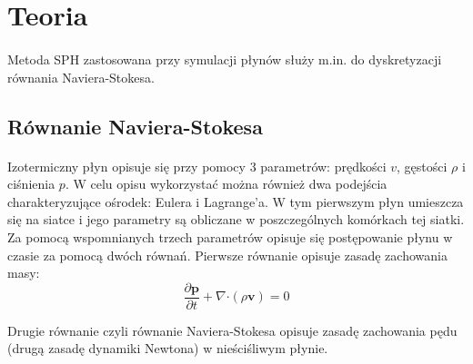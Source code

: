 \newpage

\section{Teoria}

\paragraph{}
Metoda SPH zastosowana przy symulacji płynów służy m.in. do dyskretyzacji równania Naviera-Stokesa.
\par

\subsection{Równanie Naviera-Stokesa}
\label{subsec:navier_stokes_ss}

\paragraph{}
Izotermiczny płyn opisuje się przy pomocy 3 parametrów: prędkości $v$, gęstości $\rho$ i ciśnienia $p$. W celu opisu wykorzystać można również dwa podejścia charakteryzujące ośrodek: Eulera i Lagrange'a. W tym pierwszym płyn umieszcza się na siatce i jego parametry są obliczane w poszczególnych komórkach tej siatki. Za pomocą wspomnianych trzech parametrów opisuje się postępowanie płynu w czasie za pomocą dwóch równań. Pierwsze równanie opisuje zasadę zachowania masy:
\begin{equation}
\frac{\partial \boldsymbol{p}}{\partial t} + \nabla \boldsymbol{\cdot} (\rho \boldsymbol{v}) = 0
\label{eqn:mass_conservation}
\end{equation}

Drugie równanie czyli równanie Naviera-Stokesa opisuje zasadę zachowania pędu (drugą zasadę dynamiki Newtona) w nieściśliwym płynie.

